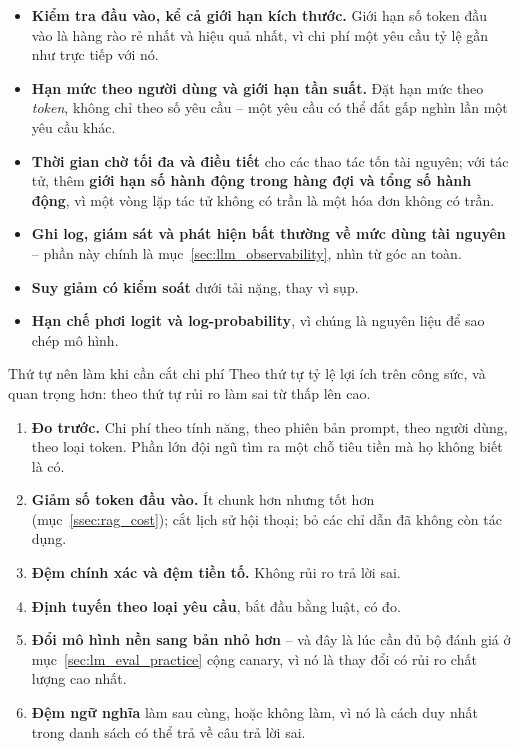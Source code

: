 \begin{itemize}
	\item \textbf{Kiểm tra đầu vào, kể cả giới hạn kích thước.} Giới hạn số token đầu vào là hàng rào rẻ nhất và hiệu quả nhất, vì chi phí một yêu cầu tỷ lệ gần như trực tiếp với nó.
	\item \textbf{Hạn mức theo người dùng và giới hạn tần suất.} Đặt hạn mức theo \emph{token}, không chỉ theo số yêu cầu -- một yêu cầu có thể đắt gấp nghìn lần một yêu cầu khác.
	\item \textbf{Thời gian chờ tối đa và điều tiết} cho các thao tác tốn tài nguyên; với tác tử, thêm \textbf{giới hạn số hành động trong hàng đợi và tổng số hành động}, vì một vòng lặp tác tử không có trần là một hóa đơn không có trần.
	\item \textbf{Ghi log, giám sát và phát hiện bất thường về mức dùng tài nguyên} -- phần này chính là mục~\ref{sec:llm_observability}, nhìn từ góc an toàn.
	\item \textbf{Suy giảm có kiểm soát} dưới tải nặng, thay vì sụp.
	\item \textbf{Hạn chế phơi logit và log-probability}, vì chúng là nguyên liệu để sao chép mô hình.
\end{itemize}

\begin{assess}{Thứ tự nên làm khi cần cắt chi phí}
Theo thứ tự tỷ lệ lợi ích trên công sức, và quan trọng hơn: theo thứ tự rủi ro làm sai từ thấp lên cao.

\begin{enumerate}
	\item \textbf{Đo trước.} Chi phí theo tính năng, theo phiên bản prompt, theo người dùng, theo loại token. Phần lớn đội ngũ tìm ra một chỗ tiêu tiền mà họ không biết là có.
	\item \textbf{Giảm số token đầu vào.} Ít chunk hơn nhưng tốt hơn (mục~\ref{ssec:rag_cost}); cắt lịch sử hội thoại; bỏ các chỉ dẫn đã không còn tác dụng.
	\item \textbf{Đệm chính xác và đệm tiền tố.} Không rủi ro trả lời sai.
	\item \textbf{Định tuyến theo loại yêu cầu}, bắt đầu bằng luật, có đo.
	\item \textbf{Đổi mô hình nền sang bản nhỏ hơn} -- và đây là lúc cần đủ bộ đánh giá ở mục~\ref{sec:lm_eval_practice} cộng canary, vì nó là thay đổi có rủi ro chất lượng cao nhất.
	\item \textbf{Đệm ngữ nghĩa} làm sau cùng, hoặc không làm, vì nó là cách duy nhất trong danh sách có thể trả về câu trả lời sai.
\end{enumerate}
\end{assess}

